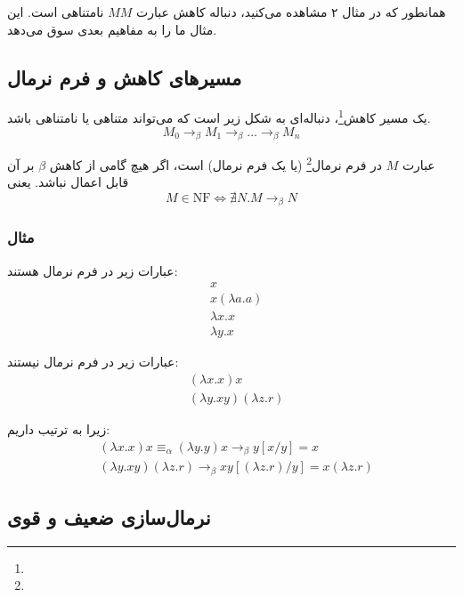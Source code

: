 همانطور که در مثال ۲ مشاهده می‌کنید، دنباله کاهش عبارت $MM$ نامتناهی است. این مثال ما را به مفاهیم بعدی سوق می‌دهد.

\subsection*{مسیرهای کاهش و فرم نرمال}\label{normalization}

\begin{defn}
یک مسیر کاهش\footnote{}،
دنباله‌ای به شکل زیر است که می‌تواند متناهی یا نامتناهی باشد.
\begin{equation*}
M_0 \rightarrow_{\beta} M_1 \rightarrow_{\beta} \dots \rightarrow_{\beta} M_n
\end{equation*}
\end{defn}

\begin{defn}
عبارت
$M$
در فرم نرمال\footnote{}
(یا یک فرم نرمال) است، اگر هیچ گامی از کاهش
$\beta$
بر آن قابل اعمال نباشد.
یعنی
\begin{equation*}
M \in \mathrm{NF} \iff \nexists N. M \rightarrow_{\beta} N
\end{equation*}
\end{defn}

\subsubsection{مثال}
عبارات زیر در فرم نرمال هستند:
\begin{align*}
&x\\
&x(\lambda a.a)\\
&\lambda x.x\\
&\lambda y.x
\end{align*}

عبارات زیر در فرم نرمال نیستند:
\begin{align*}
&(\lambda x.x)x\\
&(\lambda y.xy)(\lambda z.r)
\end{align*}

زیرا به ترتیب داریم:
\begin{align*}
&(\lambda x.x)x \equiv_{\alpha} (\lambda y.y)x \rightarrow_{\beta} y[x/y] = x\\
&(\lambda y.xy)(\lambda z.r) \rightarrow_{\beta} xy[(\lambda z.r)/y] = x(\lambda z.r)
\end{align*}

\subsection*{نرمال‌سازی ضعیف و قوی}

